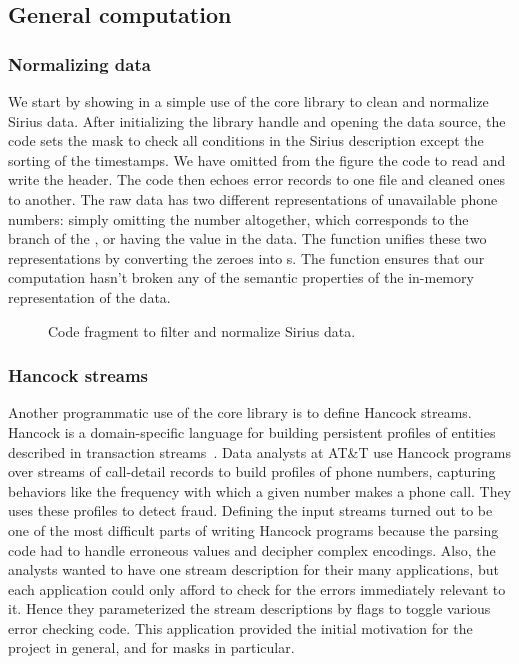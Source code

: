 \documentclass[times]{acm-sigplan}
\newcommand{\dibbler}{Sirius}
\begin{document}
\subsection{General computation}
\subsubsection{Normalizing data}
\label{subsec:general}
We start by showing in  a simple use of 
the core library to clean and normalize \dibbler{} data. After initializing
the \pads{} library handle and opening the data source, the code sets
the mask to check all conditions in the \dibbler{} description except the
sorting of the timestamps.  We have omitted from the figure the code to read and write the header. 
The code then echoes error records to one file and cleaned ones to another.
The raw data has two different representations of unavailable phone numbers:
simply omitting the number altogether, which corresponds to the 
branch of the , or having the value  in the data.  
The function  unifies these two representations 
by converting the zeroes into s.  The function 
ensures that our computation hasn't broken any of the semantic properties
of the in-memory representation of the data.
\begin{figure}[t]
\begin{small}
\begin{center}

\caption{Code fragment to filter and normalize \dibbler{} data.}
\label{figure:dibbler-filter}
\end{center}
\end{small}
\end{figure}

\subsubsection{Hancock streams}
Another programmatic use of the core library is to define  
Hancock streams.  Hancock is a domain-specific language for
building persistent profiles of entities described in transaction 
streams~\cite{hancock-toplas}.  Data analysts at AT\&T use Hancock 
programs over streams of call-detail records to build 
profiles of phone numbers, capturing behaviors like the frequency with which a given number makes a phone call.  They uses these profiles
to detect fraud. 
Defining the input streams turned out to be one of the most
difficult parts of writing Hancock programs because the parsing
code had to handle erroneous values and decipher complex encodings.  
Also, the analysts wanted to have one stream description for their
many applications, but each application could only afford to check for the errors immediately relevant to it.  Hence they parameterized the 
stream descriptions by flags to toggle various error checking code.
This application provided the initial motivation for the \pads{} project
in general, and for masks in particular.
\end{document}
